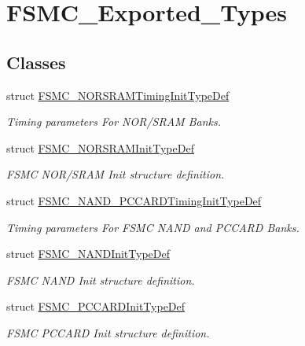 \hypertarget{group__FSMC__Exported__Types}{
\section{FSMC\_\-Exported\_\-Types}
\label{group__FSMC__Exported__Types}
}
\subsection*{Classes}
\begin{DoxyCompactItemize}
\item 
struct \hyperlink{structFSMC__NORSRAMTimingInitTypeDef}{FSMC\_\-NORSRAMTimingInitTypeDef}
\begin{DoxyCompactList}\small\item\em Timing parameters For NOR/SRAM Banks. \item\end{DoxyCompactList}\item 
struct \hyperlink{structFSMC__NORSRAMInitTypeDef}{FSMC\_\-NORSRAMInitTypeDef}
\begin{DoxyCompactList}\small\item\em FSMC NOR/SRAM Init structure definition. \item\end{DoxyCompactList}\item 
struct \hyperlink{structFSMC__NAND__PCCARDTimingInitTypeDef}{FSMC\_\-NAND\_\-PCCARDTimingInitTypeDef}
\begin{DoxyCompactList}\small\item\em Timing parameters For FSMC NAND and PCCARD Banks. \item\end{DoxyCompactList}\item 
struct \hyperlink{structFSMC__NANDInitTypeDef}{FSMC\_\-NANDInitTypeDef}
\begin{DoxyCompactList}\small\item\em FSMC NAND Init structure definition. \item\end{DoxyCompactList}\item 
struct \hyperlink{structFSMC__PCCARDInitTypeDef}{FSMC\_\-PCCARDInitTypeDef}
\begin{DoxyCompactList}\small\item\em FSMC PCCARD Init structure definition. \item\end{DoxyCompactList}\end{DoxyCompactItemize}
